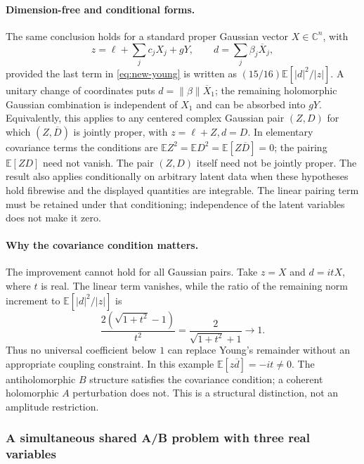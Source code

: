 \paragraph{Dimension-free and conditional forms.}
The same conclusion holds for a standard proper Gaussian vector
$X\in\mathbb C^n$, with
\[
 z=\ell+\sum_jc_jX_j+gY,\qquad d=\sum_j\beta_j\overline X_j,
\]
provided the last term in \eqref{eq:new-young} is written as
$(15/16)\mathbb E[|d|^2/|z|]$.  A unitary change of coordinates puts
$d=\|\beta\|\overline X_1$; the remaining holomorphic Gaussian combination
is independent of $X_1$ and can be absorbed into $gY$.
Equivalently, this applies to any centered complex Gaussian pair $(Z,D)$
for which $(Z,\overline D)$ is jointly proper, with $z=\ell+Z,d=D$.
In elementary covariance terms the conditions are
$\mathbb EZ^2=\mathbb ED^2=\mathbb E[Z\overline D]=0$; the pairing
$\mathbb E[ZD]$ need not vanish.  The pair $(Z,D)$ itself need not be jointly
proper.  The result also applies conditionally on arbitrary latent data
when these hypotheses hold fibrewise and the displayed quantities are
integrable.  The linear pairing term must be retained under that
conditioning; independence of the latent variables does not make it zero.

\paragraph{Why the covariance condition matters.}
The improvement cannot hold for all Gaussian pairs.  Take $z=X$ and
$d=itX$, where $t$ is real.  The linear term vanishes, while the ratio of
the remaining norm increment to $\mathbb E[|d|^2/|z|]$ is
\[
 \frac{2(\sqrt{1+t^2}-1)}{t^2}
 =\frac{2}{\sqrt{1+t^2}+1}\longrightarrow1.
\]
Thus no universal coefficient below $1$ can replace Young's remainder
without an appropriate coupling constraint.  In this example
$\mathbb E[z\overline d]=-it\ne0$.  The antiholomorphic $B$ structure
satisfies the covariance condition; a coherent holomorphic $A$ perturbation
does not.  This is a structural distinction, not an amplitude restriction.

\subsubsection{A simultaneous shared A/B problem with three real variables}

